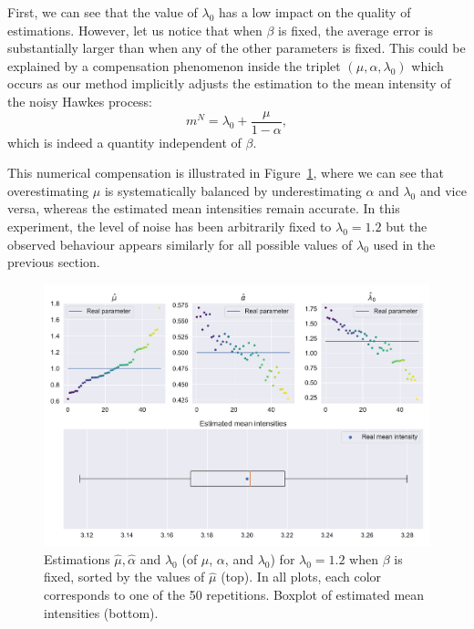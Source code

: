 		First, we can see that the value of $\lambda_0$ has a low impact on the quality of estimations.
   However, let us notice that when $\beta$ is fixed, the average error is substantially larger than when any of the other parameters is fixed.
     This could be explained by a compensation phenomenon inside the triplet $(\mu, \alpha,\lambda_0)$ which occurs as our method implicitly adjusts the estimation to the mean intensity of the noisy Hawkes process: 
     \[m^N = \lambda_0 + \frac{\mu}{1-\alpha},\]
     which is indeed a quantity independent of $\beta$.
    
    This numerical compensation is illustrated in Figure~\ref{fig:chap3_uni_compensation_beta_N}, where we can see that overestimating $\mu$ is systematically balanced by underestimating $\alpha$ and $\lambda_0$ and vice versa, whereas the estimated mean intensities remain accurate.
    In this experiment, the level of noise has been arbitrarily fixed to $\lambda_0 = 1.2$ but the observed behaviour appears similarly for all possible values of $\lambda_0$ used in the previous section.

    
    \begin{figure}[!ht]
        \centering
        \includegraphics[width=\textwidth]{images/chapter4//compensation_beta_N.pdf}
        \caption{Estimations $\hat \mu, \hat \alpha$ and $\hat \lambda_0$ (of $\mu$, $\alpha$, and $\lambda_0$) for
        $\lambda_0 = 1.2$ when $\beta$ is fixed,
        sorted by the values of $\hat{\mu}$ (top).
        In all plots, each color corresponds to one of the 50 repetitions. Boxplot of estimated mean intensities (bottom).}
        \label{fig:chap3_uni_compensation_beta_N}
        \end{figure}

